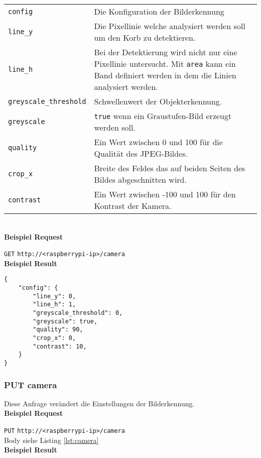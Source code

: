 \begin{tabular}{l p{16cm}}
	\texttt{config} & Die Konfiguration der Bilderkennung \\
	\texttt{line\_y} & Die Pixellinie welche analysiert werden soll um den Korb zu detektieren. \\
	\texttt{line\_h} & Bei der Detektierung wird nicht nur eine Pixellinie untersucht. Mit \texttt{area} kann ein Band definiert werden in dem die Linien analysiert werden. \\
	\texttt{greyscale\_threshold} & Schwellenwert der Objekterkennung. \\
	\texttt{greyscale} & \texttt{true} wenn ein Graustufen-Bild erzeugt werden soll. \\
	\texttt{quality} & Ein Wert zwischen 0 und 100 für die Qualität des JPEG-Bildes. \\
	\texttt{crop\_x} & Breite des Feldes das auf beiden Seiten des Bildes abgeschnitten wird. \\
	\texttt{contrast} & Ein Wert zwischen -100 und 100 für den Kontrast der Kamera. \\
\end{tabular}\\

\textbf{Beispiel Request}

\texttt{GET} 
\texttt{http://<raspberrypi-ip>/camera}\\

\textbf{Beispiel Result}

\begin{lstlisting}[caption=GET camera Result, label=lst:camera, tabsize=2]
{
	"config": {
		"line_y": 0, 
		"line_h": 1, 
		"greyscale_threshold": 0,
		"greyscale": true, 
		"quality": 90, 
		"crop_x": 0, 
		"contrast": 10, 
	}
}
\end{lstlisting}

\subsubsection{PUT camera}

Diese Anfrage verändert die Einstellungen der Bilderkennung.\\

\textbf{Beispiel Request}

\texttt{PUT}
\texttt{http://<raspberrypi-ip>/camera} \\
Body siehe Listing \ref{lst:camera}\\

\textbf{Beispiel Result}

